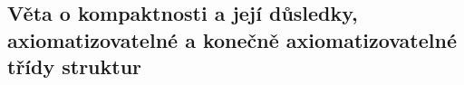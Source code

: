

\subsection{Věta o kompaktnosti a její důsledky, axiomatizovatelné a konečně axiomatizovatelné třídy struktur}
